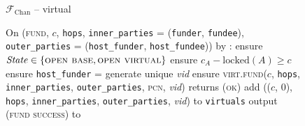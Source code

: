 \begin{figure}[H]
  \begin{systembox}{$\mathcal{F}_{\mathrm{Chan}}$ -- virtual}
    \begin{algorithmic}[1]
      \State On (\textsc{fund}, $c$, \texttt{hops}, \texttt{inner\_parties} =
      (\texttt{funder}, \texttt{fundee}), \texttt{outer\_parties} =
      (\texttt{host\_funder}, \texttt{host\_fundee})) by \alice:
      \label{code:functionality:chan:skeleton:virtual:fund}
      \Indent
        \State ensure $\mathit{State} \in \{\textsc{open base}, \textsc{open
        virtual}\}$
        \label{code:functionality:chan:skeleton:virtual:fund:start}
        \State ensure $c_A - \mathrm{locked}(A) \geq c$
        \State ensure \texttt{host\_funder} = \alice
        \label{code:functionality:chan:skeleton:virtual:fund:id}
        \State generate unique \textit{vid}
        \label{code:functionality:chan:skeleton:virtual:id}
        \State ensure \textsc{virt.fund}($c$, \texttt{hops},
        \texttt{inner\_parties}, \texttt{outer\_parties}, \textsc{pcn},
        \textit{vid}) returns (\textsc{ok})
        \label{code:functionality:chan:skeleton:virtual:fund:virt}
        \State add (($c$, 0), \texttt{hops}, \texttt{inner\_parties},
        \texttt{outer\_parties}, \textit{vid}) to \texttt{virtuals}
        \label{code:functionality:chan:skeleton:virtual:fund:store}
        \State output (\textsc{fund success}) to \alice
        \label{code:functionality:chan:skeleton:virtual:fund:end}
      \EndIndent
      \Statex


\end{algorithmic}
\end{systembox}
\end{figure}
